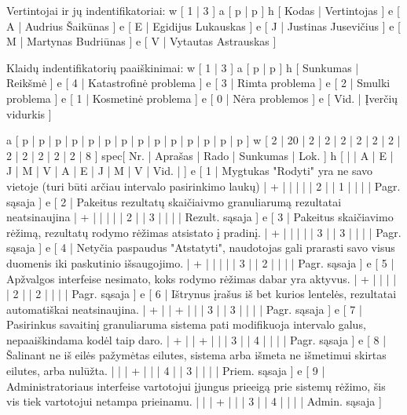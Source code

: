 Vertintojai ir jų indentifikatoriai:
\xtableu
{
  w [ 1 | 3 ]
  a [ p | p ]
  h [ Kodas | Vertintojas ]
  e [ A | Audrius Šaikūnas ]
  e [ E | Egidijus Lukauskas ]
  e [ J | Justinas Jusevičius ]
  e [ M | Martynas Budriūnas ]
  e [ V | Vytautas Astrauskas ]
}

Klaidų indentifikatorių paaiškinimai:
\xtableu
{
  w [ 1 | 3 ]
  a [ p | p ]
  h [ Sunkumas | Reikšmė ]
  e [ 4 | Katastrofinė problema ]
  e [ 3 | Rimta problema ]
  e [ 2 | Smulki problema ]
  e [ 1 | Kosmetinė problema ]
  e [ 0 | Nėra problemos ]
  e [ Vid. | Įverčių vidurkis ]
}

\xtableu
{
  a [ p   | p       | p | p | p | p | p | p | p | p | p | p | p    | p    ]
  w [ 2   | 20      | 2 | 2 | 2 | 2 | 2 | 2 | 2 | 2 | 2 | 2 | 2    | 8    ]
spec[ Nr. | Aprašas | Rado              | Sunkumas                 | Lok. ]
  h [     |         | A | E | J | M | V | A | E | J | M | V | Vid. |      ]
  e [ 1   | Mygtukas "Rodyti" yra ne savo vietoje (turi būti arčiau intervalo 
  pasirinkimo laukų)
                    | + |   |   |   |   | 2 |   | 1 |   |   |      | Pagr. sąsaja ]
  e [ 2   | Pakeitus rezultatų skaičiaivmo granuliarumą rezultatai neatsinaujina
                    | + |   |   |   |   | 2 |   | 3 |   |   |      | Rezult. sąsaja ]
  e [ 3   | Pakeitus skaičiavimo rėžimą, rezultatų rodymo rėžimas atsistato
  į pradinį.
                    | + |   |   |   |   | 3 |   | 3 |   |   |      | Pagr. sąsaja ]
  e [ 4   | Netyčia paspaudus "Atstatyti", naudotojas gali prarasti savo visus duomenis
  iki paskutinio išsaugojimo. 
                    | + |   |   |   |   | 3 |   | 2 |   |   |      | Pagr. sąsaja ]
  e [ 5   | Apžvalgos interfeise nesimato, koks rodymo rėžimas dabar yra aktyvus.
                    | + |   |   |   |   | 2 |   | 2 |   |   |      | Pagr. sąsaja ]
  e [ 6   | Ištrynus įrašus iš bet kurios lentelės, rezultatai automatiškai neatsinaujina.
                    | + |   | + |   |   | 3 |   | 3 |   |   |      | Pagr. sąsaja ]
  e [ 7   | Pasirinkus savaitinį granuliaruma sistema pati modifikuoja intervalo galus,
  nepaaiškindama kodėl taip daro.
                    | + |   | + |   |   | 3 |   | 4 |   |   |      | Pagr. sąsaja ]
  e [ 8   | Šalinant ne iš eilės pažymėtas eilutes, sistema arba išmeta ne išmetimui
  skirtas eilutes, arba nulūžta.  
                    |   |   | + |   |   | 4 |   | 3 |   |   |      | Priem. sąsaja ]
  e [ 9   | Administratoriaus interfeise vartotojui įjungus prieeigą prie sistemų
  rėžimo, šis vis tiek vartotojui netampa prieinamu.     
                    |   |   | + |   |   | 3 |   | 4 |   |   |      | Admin. sąsaja ]
}
